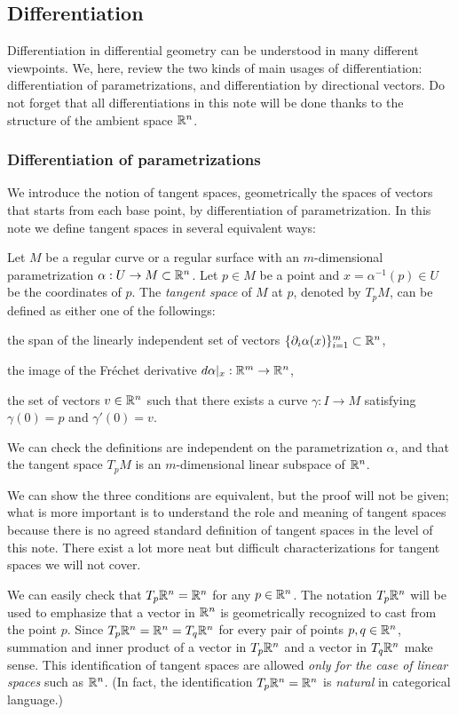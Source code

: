 \documentclass{../exp}
\def\a{\alpha}
\begin{document}
\subsection{Differentiation}
Differentiation in differential geometry can be understood in many different viewpoints.
We, here, review the two kinds of main usages of differentiation: differentiation of parametrizations, and differentiation by directional vectors.
Do not forget that all differentiations in this note will be done thanks to the structure of the ambient space $\mathbb{R}^n$.

\subsubsection{Differentiation of parametrizations}
We introduce the notion of tangent spaces, geometrically the spaces of vectors that starts from each base point, by differentiation of parametrization.
In this note we define tangent spaces in several equivalent ways:
\begin{defn}
Let $M$ be a regular curve or a regular surface with an $m$-dimensional parametrization $\a:U\to M\subset\R^n$.
Let $p\in M$ be a point and $x=\a^{-1}(p)\in U$ be the coordinates of $p$.
The \emph{tangent space} of $M$ at $p$, denoted by $T_pM$, can be defined as either one of the followings:
\begin{cond}
\item the span of the linearly independent set of vectors $\{\pd_i\a(x)\}_{i=1}^m\subset\R^n$,
\item the image of the Fr\'echet derivative $d\a|_x:\R^m\to\R^n$,
\item the set of vectors $v\in\mathbb{R}^n$ such that there exists a curve $\gamma:I\to M$ satisfying $\gamma(0)=p$ and $\gamma'(0)=v$.
\end{cond}
We can check the definitions are independent on the parametrization $\a$, and that the tangent space $T_pM$ is an $m$-dimensional linear subspace of $\mathbb{R}^n$.
\end{defn}
\begin{rmk}
We can show the three conditions are equivalent, but the proof will not be given; what is more important is to understand the role and meaning of tangent spaces because there is no agreed standard definition of tangent spaces in the level of this note.
There exist a lot more neat but difficult characterizations for tangent spaces we will not cover.
\end{rmk}
\begin{rmk}
We can easily check that $T_p\mathbb{R}^n=\mathbb{R}^n$ for any $p\in\mathbb{R}^n$.
The notation $T_p\mathbb{R}^n$ will be used to emphasize that a vector in $\mathbb{R}^n$ is geometrically recognized to cast from the point $p$.
Since $T_p\mathbb{R}^n=\mathbb{R}^n=T_q\mathbb{R}^n$ for every pair of points $p,q\in\mathbb{R}^n$, summation and inner product of a vector in $T_p\mathbb{R}^n$ and a vector in $T_q\mathbb{R}^n$ make sense.
This identification of tangent spaces are allowed \emph{only for the case of linear spaces} such as $\mathbb{R}^n$.
(In fact, the identification $T_p\mathbb{R}^n=\mathbb{R}^n$ is \emph{natural} in categorical language.)
\end{rmk}
\end{document}
